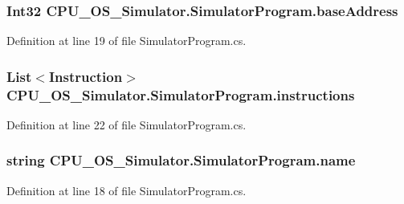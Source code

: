 \subsubsection[{base\+Address}]{\setlength{\rightskip}{0pt plus 5cm}Int32 C\+P\+U\+\_\+\+O\+S\+\_\+\+Simulator.\+Simulator\+Program.\+base\+Address\hspace{0.3cm}{\ttfamily [private]}}\label{class_c_p_u___o_s___simulator_1_1_simulator_program_a71863cf3341045e483ccc52778d3ccc5}


Definition at line 19 of file Simulator\+Program.\+cs.

\hypertarget{class_c_p_u___o_s___simulator_1_1_simulator_program_ae4303a418ecb85dc6c88c9899fd81bc5}{}
\subsubsection[{instructions}]{\setlength{\rightskip}{0pt plus 5cm}List$<${\bf Instruction}$>$ C\+P\+U\+\_\+\+O\+S\+\_\+\+Simulator.\+Simulator\+Program.\+instructions\hspace{0.3cm}{\ttfamily [private]}}\label{class_c_p_u___o_s___simulator_1_1_simulator_program_ae4303a418ecb85dc6c88c9899fd81bc5}


Definition at line 22 of file Simulator\+Program.\+cs.

\hypertarget{class_c_p_u___o_s___simulator_1_1_simulator_program_a01c3215b15e9c8e8502f35e7c8e574bd}{}
\subsubsection[{name}]{\setlength{\rightskip}{0pt plus 5cm}string C\+P\+U\+\_\+\+O\+S\+\_\+\+Simulator.\+Simulator\+Program.\+name\hspace{0.3cm}{\ttfamily [private]}}\label{class_c_p_u___o_s___simulator_1_1_simulator_program_a01c3215b15e9c8e8502f35e7c8e574bd}


Definition at line 18 of file Simulator\+Program.\+cs.

